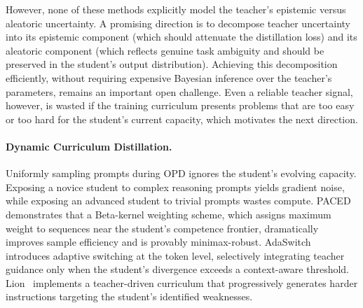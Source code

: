 \documentclass{article} %
\begin{document}
However, none of these methods explicitly model the teacher's epistemic versus aleatoric uncertainty. A promising direction is to decompose teacher uncertainty into its epistemic component (which should attenuate the distillation loss) and its aleatoric component (which reflects genuine task ambiguity and should be preserved in the student's output distribution). Achieving this decomposition efficiently, without requiring expensive Bayesian inference over the teacher's parameters, remains an important open challenge. Even a reliable teacher signal, however, is wasted if the training curriculum presents problems that are too easy or too hard for the student's current capacity, which motivates the next direction.

\paragraph{Dynamic Curriculum Distillation.}
Uniformly sampling prompts during OPD ignores the student's evolving capacity. Exposing a novice student to complex reasoning prompts yields gradient noise, while exposing an advanced student to trivial prompts wastes compute. PACED~\citep{2603.11178} demonstrates that a Beta-kernel weighting scheme, which assigns maximum weight to sequences near the student's competence frontier, dramatically improves sample efficiency and is provably minimax-robust. AdaSwitch~\citep{2510.07842} introduces adaptive switching at the token level, selectively integrating teacher guidance only when the student's divergence exceeds a context-aware threshold. Lion~\citep{2305.12870} implements a teacher-driven curriculum that progressively generates harder instructions targeting the student's identified weaknesses.
\end{document}
